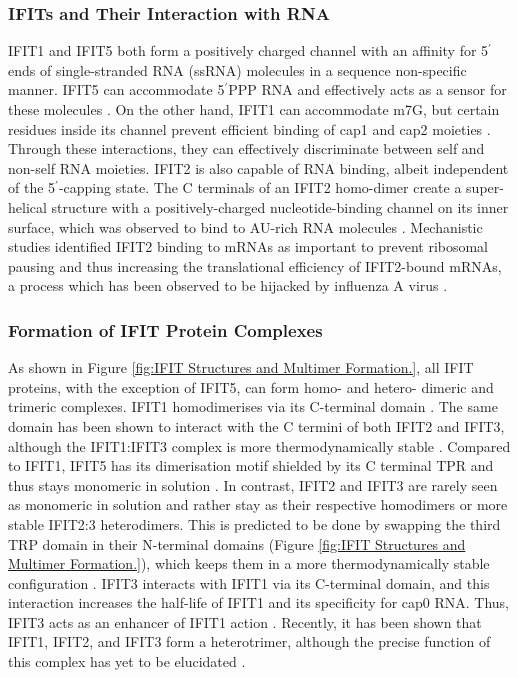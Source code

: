 \subsubsection{IFITs and Their Interaction with RNA} \label{IFITs and Their Interaction with RNA}
IFIT1 and IFIT5 both form a positively charged channel with an affinity for 5$^{\prime}$ ends of single-stranded RNA (ssRNA) molecules in a sequence non-specific manner. IFIT5 can accommodate 5$^{\prime}$PPP RNA and effectively acts as a sensor for these molecules \cite{Abbas2013StructuralProteins, Pichlmair2011IFIT1RNA}. On the other hand, IFIT1 can accommodate m7G, but certain residues inside its channel prevent efficient binding of cap1 and cap2 moieties \cite{Diamond2014IFIT1:Translation, Mears2018BetterResponse}. Through these interactions, they can effectively discriminate between self and non-self RNA moieties. IFIT2 is also capable of RNA binding, albeit independent of the 5$^{\prime}$-capping state. The C terminals of an IFIT2 homo-dimer create a super-helical structure with a positively-charged nucleotide-binding channel on its inner surface, which was observed to bind to AU-rich RNA molecules \cite{Yang2012CrystalMechanisms, Vladimer2014IFITs:Proteins}. Mechanistic studies identified IFIT2 binding to mRNAs as important to prevent ribosomal pausing and thus increasing the translational efficiency of IFIT2-bound mRNAs, a process which has been observed to be hijacked by influenza A virus \cite{Tran2020InfluenzaMRNAs}.

\subsubsection{Formation of IFIT Protein Complexes} \label{Formation of IFIT Protein Complexes}
As shown in Figure \ref{fig:IFIT Structures and Multimer Formation.}, all IFIT proteins, with the exception of IFIT5, can form homo- and hetero- dimeric and trimeric complexes. IFIT1 homodimerises via its C-terminal domain \cite{Abbas2013StructuralProteins}. The same domain has been shown to interact with the C termini of both IFIT2 and IFIT3, although the IFIT1:IFIT3 complex is more thermodynamically stable \cite{Fleith2018IFIT3RNA, Stawowczyk2011TheApoptosis}. Compared to IFIT1, IFIT5 has its dimerisation motif shielded by its C terminal TPR and thus stays monomeric in solution \cite{Kumar2014InhibitionMRNAs}. In contrast, IFIT2 and IFIT3 are rarely seen as monomeric in solution and rather stay as their respective homodimers or more stable IFIT2:3 heterodimers. This is predicted to be done by swapping the third TRP domain in their N-terminal domains (Figure \ref{fig:IFIT Structures and Multimer Formation.}), which keeps them in a more thermodynamically stable configuration \cite{Yang2012CrystalMechanisms}. IFIT3 interacts with IFIT1 via its C-terminal domain, and this interaction increases the half-life of IFIT1 and its specificity for cap0 RNA. Thus, IFIT3 acts as an enhancer of IFIT1 action \cite{Fleith2018IFIT3RNA, Johnson2018HumanStability}. Recently, it has been shown that IFIT1, IFIT2, and IFIT3 form a heterotrimer, although the precise function of this complex has yet to be elucidated \cite{Fleith2018IFIT3RNA}. 

